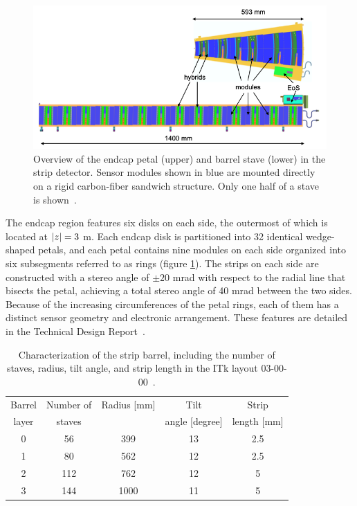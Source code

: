 \begin{figure}[h]
    \centering
    \includegraphics[width=0.8\linewidth]{figures/strip-stave-petal.png}
    \caption{Overview of the endcap petal (upper) and barrel stave (lower) in the strip detector. Sensor modules shown in blue are mounted directly on a rigid carbon-fiber sandwich structure. Only one half of a stave is shown~\cite{ATLAS-TDR-25}.}
    \label{fig:strip-stave-petal}
\end{figure}

The endcap region features six disks on each side, the outermost of which is located at $\abs{z}=3$ m. Each endcap disk is partitioned into 32 identical wedge-shaped petals, and each petal contains nine modules on each side organized into six subsegments referred to as rings (figure \ref{fig:strip-stave-petal}). The strips on each side are constructed with a stereo angle of $\pm20$ mrad with respect to the radial line that bisects the petal, achieving a total stereo angle of 40 mrad between the two sides. Because of the increasing circumferences of the petal rings, each of them has a distinct sensor geometry and electronic arrangement. These features are detailed in the Technical Design Report~\cite{ATLAS-TDR-25}.

\begin{table}[h]
    \centering
    \begin{tabular}{|c|c|c|c|c|}
    \hline
       Barrel  & Number of & Radius [mm] & Tilt           & Strip \\
       layer   & staves    &             & angle [degree] & length [mm] \\ \hline
        0      & 56         & 399 & 13 &  2.5 \\
        1       & 80        & 562 & 12 &  2.5 \\
        2       & 112       & 762 & 12 &  5 \\
        3       & 144       & 1000 & 11 & 5 \\ \hline
    \end{tabular}
    \caption{Characterization of the strip barrel, including the number of staves, radius, tilt angle, and strip length in the ITk layout 03-00-00~\cite{Aad_2025}.}
    \label{tab:strip-barrel}
\end{table}

